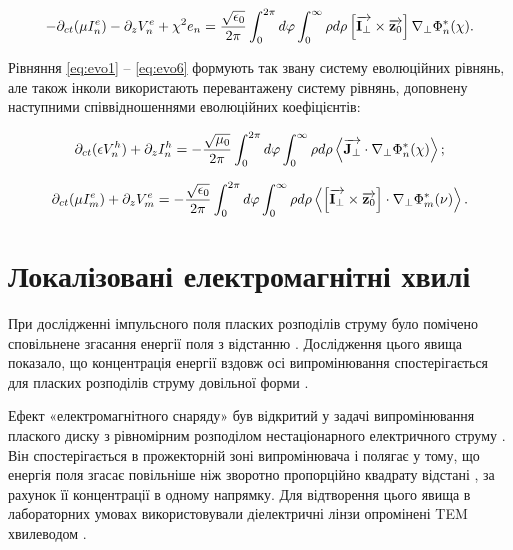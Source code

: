 \begin{equation} \label{eq:evo6}
- \partial_{ct}(\mu I_n^e) - \partial_z V_n^e + \chi^2 e_n = 
\frac{\sqrt{\epsilon_0}}{2 \pi} \int_0^{2\pi} d \varphi 
\int_0^{\infty} \rho d \rho \left[ \overrightarrow{\mathbf I_\perp} \times \overrightarrow{\mathbf z_0} \right]
\nabla_\perp \Phi_n^* (\chi).
\end{equation}

Рівняння \eqref{eq:evo1} -- \eqref{eq:evo6} формують так звану систему 
еволюційних рівнянь, але також інколи використають перевантажену систему 
рівнянь, доповнену наступними співвідношеннями еволюційних коефіцієнтів:

\begin{equation}
\partial_{ct} (\epsilon V_n^h) + \partial_z I_n^h = 
- \frac{\sqrt{\mu_0}}{2 \pi} \int_0^{2\pi} d \varphi 
\int_0^{\infty} \rho d \rho 
\left< \overrightarrow{\mathbf J_\perp} \cdot \nabla_\perp \Phi_n^* (\chi) \right>;
\end{equation}

\begin{equation}
\partial_{ct}(\mu I_m^e) + \partial_z V_m^e = - 
\frac{\sqrt{\epsilon_0}}{2 \pi} \int_0^{2\pi} d \varphi 
\int_0^{\infty} \rho d \rho 
\left< \left[ \overrightarrow{\mathbf I_\perp} \times \overrightarrow{\mathbf z_0} \right]  \cdot  \nabla_\perp \Phi_m^* (\nu)  \right>.
\end{equation}

\section{Локалізовані електромагнітні хвилі}

При дослідженні імпульсного поля пласких розподілів струму було 
помічено сповільнене згасання енергії поля з відстанню \cite{imp:Wu1989}. 
Дослідження цього явища показало, що концентрація енергії вздовж осі 
випромінювання спостерігається для пласких розподілів струму довільної форми 
\cite{imp:Wu1985}.

Ефект «електромагнітного снаряду» був відкритий у задачі випромінювання 
плаского диску з рівномірним розподілом нестаціонарного електричного струму 
\cite{imp:Wu1985}. Він спостерігається в прожекторній зоні випромінювача і 
полягає у тому, що енергія поля згасає повільніше ніж зворотно пропорційно 
квадрату відстані \cite{imp:Sodin1992-10}, за рахунок її концентрації в 
одному напрямку. Для відтворення цього явища в лабораторних умовах 
використовували діелектричні лінзи опромінені TEM хвилеводом \cite{imp:Wu1991}.

